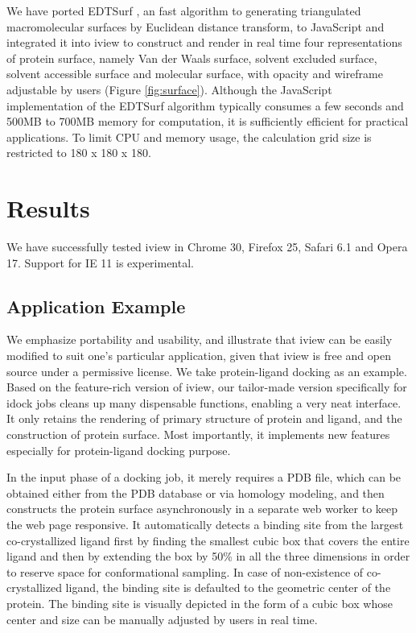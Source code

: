 \documentclass[twocolumn]{bmcart}%
\begin{document}
We have ported EDTSurf \cite{1297,1350}, an fast algorithm to generating triangulated macromolecular surfaces by Euclidean distance transform, to JavaScript and integrated it into iview to construct and render in real time four representations of protein surface, namely Van der Waals surface, solvent excluded surface, solvent accessible surface and molecular surface, with opacity and wireframe adjustable by users (Figure \ref{fig:surface}). Although the JavaScript implementation of the EDTSurf algorithm typically consumes a few seconds and 500MB to 700MB memory for computation, it is sufficiently efficient for practical applications. To limit CPU and memory usage, the calculation grid size is restricted to 180 x 180 x 180.

\section*{Results}
We have successfully tested iview in Chrome 30, Firefox 25, Safari 6.1 and Opera 17. Support for IE 11 is experimental.

\subsection*{Application Example}
We emphasize portability and usability, and illustrate that iview can be easily modified to suit one's particular application, given that iview is free and open source under a permissive license. We take protein-ligand docking as an example. Based on the feature-rich version of iview, our tailor-made version specifically for idock jobs cleans up many dispensable functions, enabling a very neat interface. It only retains the rendering of primary structure of protein and ligand, and the construction of protein surface. Most importantly, it implements new features especially for protein-ligand docking purpose.

In the input phase of a docking job, it merely requires a PDB file, which can be obtained either from the PDB database \cite{537} or via homology modeling, and then constructs the protein surface asynchronously in a separate web worker to keep the web page responsive. It automatically detects a binding site from the largest co-crystallized ligand first by finding the smallest cubic box that covers the entire ligand and then by extending the box by 50\% in all the three dimensions in order to reserve space for conformational sampling. In case of non-existence of co-crystallized ligand, the binding site is defaulted to the geometric center of the protein. The binding site is visually depicted in the form of a cubic box whose center and size can be manually adjusted by users in real time.
\end{document}
